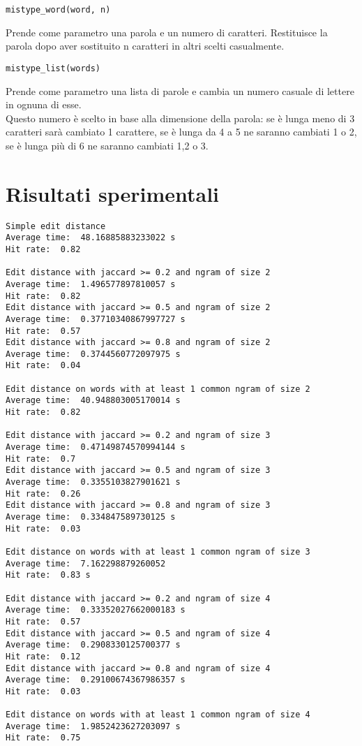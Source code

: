 \documentclass[]{article}
\begin{document}
\begin{verbatim}
mistype_word(word, n)
\end{verbatim}
Prende come parametro una parola e un numero di caratteri. Restituisce la parola dopo aver sostituito n caratteri in altri scelti casualmente.

\begin{verbatim}
mistype_list(words)
\end{verbatim}
Prende come parametro una lista di parole e cambia un numero casuale di lettere in ognuna di esse.\\ Questo numero è scelto in base alla dimensione della parola: se è lunga meno di 3 caratteri sarà cambiato 1 carattere, se è lunga da 4 a 5 ne saranno cambiati 1 o 2, se è lunga più di 6 ne saranno cambiati 1,2 o 3.\\
\newpage
\section{Risultati sperimentali}
\begin{verbatim}
Simple edit distance
Average time:  48.16885883233022 s
Hit rate:  0.82 

Edit distance with jaccard >= 0.2 and ngram of size 2
Average time:  1.496577897810057 s
Hit rate:  0.82 
Edit distance with jaccard >= 0.5 and ngram of size 2
Average time:  0.37710340867997727 s
Hit rate:  0.57 
Edit distance with jaccard >= 0.8 and ngram of size 2
Average time:  0.3744560772097975 s
Hit rate:  0.04 

Edit distance on words with at least 1 common ngram of size 2
Average time:  40.948803005170014 s
Hit rate:  0.82 

Edit distance with jaccard >= 0.2 and ngram of size 3
Average time:  0.47149874570994144 s
Hit rate:  0.7 
Edit distance with jaccard >= 0.5 and ngram of size 3
Average time:  0.3355103827901621 s
Hit rate:  0.26 
Edit distance with jaccard >= 0.8 and ngram of size 3
Average time:  0.334847589730125 s
Hit rate:  0.03 

Edit distance on words with at least 1 common ngram of size 3
Average time:  7.162298879260052
Hit rate:  0.83 s

Edit distance with jaccard >= 0.2 and ngram of size 4
Average time:  0.33352027662000183 s
Hit rate:  0.57 
Edit distance with jaccard >= 0.5 and ngram of size 4
Average time:  0.2908330125700377 s
Hit rate:  0.12 
Edit distance with jaccard >= 0.8 and ngram of size 4
Average time:  0.29100674367986357 s
Hit rate:  0.03 

Edit distance on words with at least 1 common ngram of size 4
Average time:  1.9852423627203097 s
Hit rate:  0.75 
\end{verbatim}
\newpage
\end{document}
